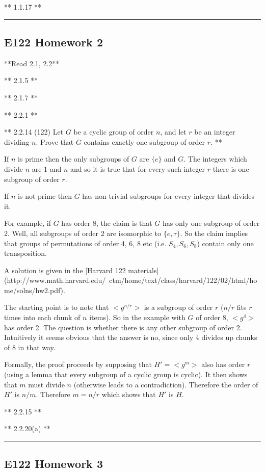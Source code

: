** 1.1.17 **

\hrule
\subsection{E122 Homework 2}
**Read 2.1, 2.2**

** 2.1.5 **

** 2.1.7 **

** 2.2.1 **

** 2.2.14 (122) Let $G$ be a cyclic group of order $n$, and let $r$ be an integer
dividing $n$. Prove that $G$ contains exactly one subgroup of order $r$. **

If $n$ is prime then the only subgroups of $G$ are $\{e\}$ and $G$. The
integers which divide $n$ are 1 and $n$ and so it is true that for every such
integer $r$ there is one subgroup of order $r$.

If $n$ is not prime then $G$ has non-trivial subgroups for every integer that
divides it.

For example, if $G$ has order 8, the claim is that $G$ has only one subgroup of
order 2. Well, all subgroups of order 2 are isomorphic to $\{e, \tau\}$. So the
claim implies that groups of permutations of order 4, 6, 8 etc (i.e. $S_4, S_6,
S_8$) contain only one transposition.


A solution is given in the
[Harvard 122 materials](http://www.math.harvard.edu/~ctm/home/text/class/harvard/122/02/html/home/solns/hw2.pdf).

The starting point is to note that $<g^{n/r}>$ is a subgroup of order $r$
($n/r$ fits $r$ times into each chunk of $n$ items). So in the example with $G$
of order 8, $<g^{4}>$ has order 2. The question is whether there is any other
subgroup of order 2. Intuitively it seems obvious that the answer is no, since
only 4 divides up chunks of 8 in that way.

Formally, the proof proceeds by supposing that $H' = <g^m>$ also has order $r$
(using a lemma that every subgroup of a cyclic group is cyclic). It then shows
that $m$ must divide $n$ (otherwise leads to a contradiction). Therefore the
order of $H'$ is $n/m$. Therefore $m = n/r$ which shows that $H'$ is $H$.

** 2.2.15 **

** 2.2.20(a) **


\hrule

\subsection{E122 Homework 3}

